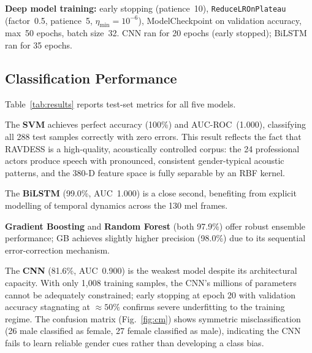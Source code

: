 \documentclass[conference]{IEEEtran}
\begin{document}
\textbf{Deep model training:} early stopping (patience~10),
\texttt{ReduceLROnPlateau} (factor~0.5, patience~5,
$\eta_\text{min}\!=\!10^{-6}$), ModelCheckpoint on validation accuracy,
max~50 epochs, batch size~32.
CNN ran for 20 epochs (early stopped); BiLSTM ran for 35 epochs.

\subsection{Classification Performance}

Table~\ref{tab:results} reports test-set metrics for all five models.

The \textbf{SVM} achieves perfect accuracy (100\%) and AUC-ROC~(1.000),
classifying all 288 test samples correctly with zero errors.
This result reflects the fact that RAVDESS is a high-quality, acoustically
controlled corpus: the 24 professional actors produce speech with
pronounced, consistent gender-typical acoustic patterns, and the 380-D
feature space is fully separable by an RBF kernel.

The \textbf{BiLSTM} (99.0\%, AUC~1.000) is a close second, benefiting
from explicit modelling of temporal dynamics across the 130 mel frames.

\textbf{Gradient Boosting} and \textbf{Random Forest} (both 97.9\%)
offer robust ensemble performance; GB achieves slightly higher precision
(98.0\%) due to its sequential error-correction mechanism.

The \textbf{CNN} (81.6\%, AUC~0.900) is the weakest model despite its
architectural capacity. With only 1,008 training samples, the CNN's
millions of parameters cannot be adequately constrained; early stopping at
epoch 20 with validation accuracy stagnating at $\approx\!50\%$ confirms
severe underfitting to the training regime. The confusion matrix
(Fig.~\ref{fig:cm}) shows symmetric misclassification (26 male classified
as female, 27 female classified as male), indicating the CNN fails to learn
reliable gender cues rather than developing a class bias.
\end{document}
